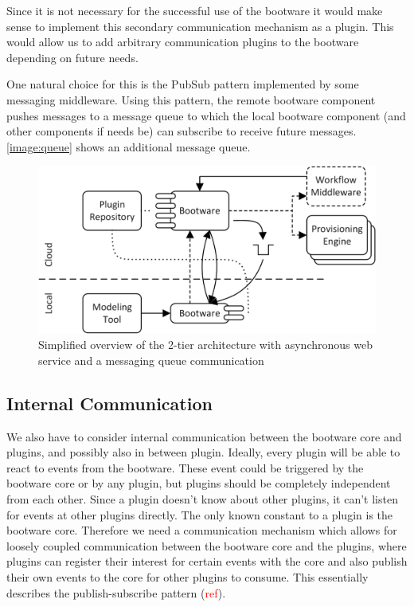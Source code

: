 Since it is not necessary for the successful use of the bootware it would make sense to implement this secondary communication mechanism as a plugin.
This would allow us to add arbitrary communication plugins to the bootware depending on future needs.

One natural choice for this is the PubSub pattern implemented by some messaging middleware.
Using this pattern, the remote bootware component pushes messages to a message queue to which the local bootware component (and other components if needs be) can subscribe to receive future messages.
\autoref{image:queue} shows an additional message queue.

\begin{figure}[!htbp]
	\centering
	\includegraphics[resolution=600]{design/assets/simple_queue}
	\caption{Simplified overview of the 2-tier architecture with asynchronous web service and a messaging queue communication}
	\label{image:queue}
\end{figure}

\subsection{Internal Communication}

We also have to consider internal communication between the bootware core and plugins, and possibly also in between plugin.
Ideally, every plugin will be able to react to events from the bootware.
These event could be triggered by the bootware core or by any plugin, but plugins should be completely independent from each other.
Since a plugin doesn't know about other plugins, it can't listen for events at other plugins directly.
The only known constant to a plugin is the bootware core.
Therefore we need a communication mechanism which allows for loosely coupled communication between the bootware core and the plugins, where plugins can register their interest for certain events with the core and also publish their own events to the core for other plugins to consume.
This essentially describes the publish-subscribe pattern (\textcolor{red}{ref}).

